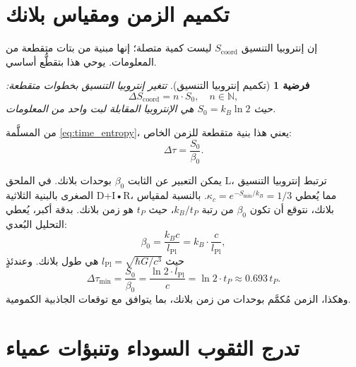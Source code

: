 \documentclass[11pt,a4paper]{article}
\newcommand{\kappac}{\kappa_c}
\newcommand{\Lpl}{l_{\mathrm{Pl}}}
\newcommand{\Scoord}{S_{\mathrm{coord}}}
\newtheorem{hypothesis}[theorem]{فرضية}
\begin{document}
	\section{تكميم الزمن ومقياس بلانك}
	\label{sec:quantization}
	
	إن إنتروبيا التنسيق \(\Scoord\) ليست كمية متصلة؛ إنها مبنية من بتات متقطعة من المعلومات. يوحي هذا بتقطُّع أساسي.
	
	\begin{hypothesis}[تكميم إنتروبيا التنسيق]
		تتغير إنتروبيا التنسيق بخطوات متقطعة:
		\begin{equation}
			\Delta \Scoord = n \cdot S_0, \quad n \in \mathbb{N},
		\end{equation}
		حيث \(S_0 = k_B \ln 2\) هي الإنتروبيا المقابلة لبت واحد من المعلومات.
	\end{hypothesis}
	
	من المسلَّمة \ref{eq:time_entropy}، يعني هذا بنية متقطعة للزمن الخاص:
	\begin{equation}
		\Delta \tau = \frac{S_0}{\beta_0}.
	\end{equation}
	
	يمكن التعبير عن الثابت \(\beta_0\) بوحدات بلانك. في الملحق L، ترتبط إنتروبيا التنسيق الصغرى بالبنية الثلاثية D+I•R، مما يُعطي \(\kappac = e^{-S_{\min}/k_B} = 1/3\). بالنسبة لمقياس بلانك، نتوقع أن تكون \(\beta_0\) من رتبة \(k_B / t_P\)، حيث \(t_P\) هو زمن بلانك. بدقة أكبر، يُعطي التحليل البُعدي:
	\begin{equation}
		\beta_0 = \frac{k_B c}{\Lpl} = k_B \cdot \frac{c}{\Lpl},
	\end{equation}
	حيث \(\Lpl = \sqrt{\hbar G/c^3}\) هي طول بلانك. وعندئذٍ
	\begin{equation}
		\Delta \tau_{\min} = \frac{S_0}{\beta_0} = \frac{\ln 2 \cdot \Lpl}{c} = \ln 2 \cdot t_P \approx 0.693 \, t_P.
	\end{equation}
	وهكذا، الزمن مُكمَّم بوحدات من زمن بلانك، بما يتوافق مع توقعات الجاذبية الكمومية.
	
	\section{تدرج الثقوب السوداء وتنبؤات عمياء}
	\label{sec:blackhole}
	
\end{document}
